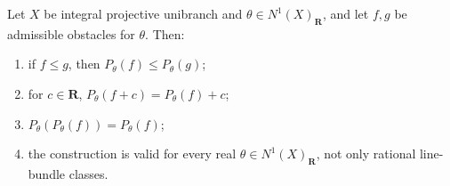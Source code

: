 \begin{proposition}\label{prop:bj-final-obstacle-calculus}
Let $X$ be integral projective unibranch and
$\theta\in N^1(X)_{\mathbf R}$, and let $f,g$ be admissible obstacles
for $\theta$.  Then:
\begin{enumerate}
\item if $f\le g$, then $P_\theta(f)\le P_\theta(g)$;
\item for $c\in\mathbf R$,
      $P_\theta(f+c)=P_\theta(f)+c$;
\item $P_\theta(P_\theta(f))=P_\theta(f)$;
\item the construction is valid for every real
      $\theta\in N^1(X)_{\mathbf R}$, not only rational line-bundle classes.
\end{enumerate}
\par
\end{proposition}

